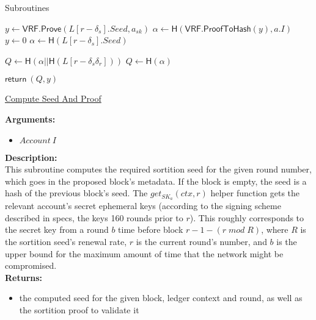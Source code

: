 \documentclass[10pt,a4paper]{article}
\begin{document}
\begin{section}{Subroutines}

\begin{algorithm}[H]\label{algo:compute-seed}
    \begin{algorithmic}[1]
             \State $y \gets \mathsf{VRF.Prove}(L[r-\delta_s].Seed, a_{sk})$
             \State $\alpha \gets \mathsf{H}(\mathsf{VRF.ProofToHash}(y), a.I)$
        \Else
            \State $y \gets 0$
            \State $\alpha \gets \mathsf{H}(L[r-\delta_s].Seed)$
        \EndIf

            \State $Q \gets \mathsf{H}(\alpha||\mathsf{H}(L[r-\delta_s\delta_r]))$
        \Else
            \State $Q \gets \mathsf{H}(\alpha)$
        \EndIf

         \State $\mathsf{return} \ (Q, y)$
    \EndFunction
    \end{algorithmic}
    \caption{\underline{Compute Seed And Proof}}
\end{algorithm}


\noindent \textbf{Arguments:}
\begin{itemize}
    \item $Account \ I$
  \end{itemize}


\noindent \textbf{Description:}\\
This subroutine computes the required sortition seed for the given round number, 
which goes in the proposed block's metadata.
If the block is empty, the seed is a hash of the previous block's seed.
The $get_{SK_a}(ctx, r)$ helper function gets the relevant account's secret 
ephemeral keys (according to the signing scheme described in specs, the keys 
160 rounds prior to $r$).
This roughly corresponds to the secret key from a round $b$ time before block 
$r-1-(r\;mod\;R)$, where $R$ is the sortition seed's renewal rate, $r$ is the 
current round's number, and $b$ is the upper bound for the maximum amount of 
time that the network might be compromised.\\

\noindent \textbf{Returns:}
\begin{itemize}
    \item the computed seed for the given block, ledger context and round, as well as the sortition proof
    to validate it
  \end{itemize}


\end{section}
\end{document}
